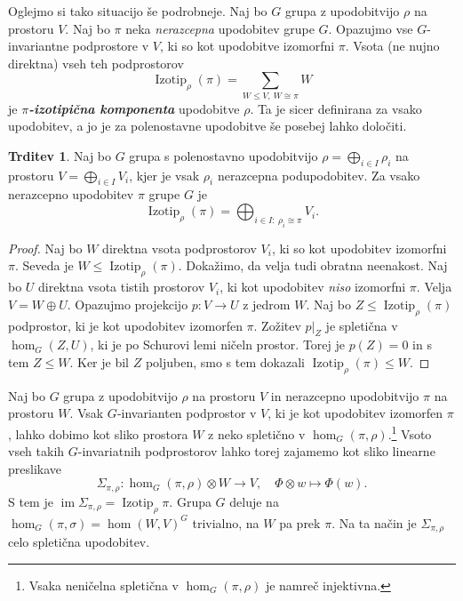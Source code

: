 \documentclass[11pt]{book}
\DeclareMathOperator\image{im}
\DeclareMathOperator\Izotip{Izotip}
\def\definicija{\color{rdeca}\bf\em}
\theoremstyle{definition}
\theoremstyle{zgled}
\theoremstyle{odprtproblem}
\theoremstyle{domacanaloga}
\newenvironment{dokaz}
    {\color{siva}\begin{proof}}
    {\end{proof}}
\theoremstyle{izrek}
\newtheorem*{trditev}{Trditev}
\begin{document}
Oglejmo si tako situacijo še podrobneje. Naj bo $G$ grupa z upodobitvijo $\rho$ na prostoru $V$. Naj bo $\pi$ neka \emph{nerazcepna} upodobitev grupe $G$. Opazujmo vse $G$-invariantne podprostore v $V$, ki so kot upodobitve izomorfni $\pi$. Vsota (ne nujno direktna) vseh teh podprostorov
\[
    \displaystyle \Izotip_{\rho}(\pi) = \sum_{W \leq V, \ W \cong \pi} W
\]
je {\definicija $\pi$-izotipična komponenta} upodobitve $\rho$. Ta je sicer definirana za vsako upodobitev, a jo je za polenostavne upodobitve še posebej lahko določiti.

\begin{trditev}
Naj bo $G$ grupa s polenostavno upodobitvijo $\rho = \bigoplus_{i \in I} \rho_i$ na prostoru $V = \bigoplus_{i \in I} V_i$, kjer je vsak $\rho_i$ nerazcepna podupodobitev. Za vsako nerazcepno upodobitev $\pi$ grupe $G$ je
\[
    \displaystyle \Izotip_{\rho}(\pi) = \bigoplus_{i \in I \colon \ \rho_i \cong \pi} V_i.
\]
\end{trditev}
\begin{dokaz}    
Naj bo $W$ direktna vsota podprostorov $V_i$, ki so kot upodobitev izomorfni $\pi$. Seveda je $W \leq \Izotip_{\rho}(\pi)$. Dokažimo, da velja tudi obratna neenakost. Naj bo $U$ direktna vsota tistih prostorov $V_i$, ki kot upodobitev \emph{niso} izomorfni $\pi$. Velja $V = W \oplus U$. Opazujmo projekcijo $p \colon V \to U$ z jedrom $W$. Naj bo $Z \leq \Izotip_{\rho}(\pi)$ podprostor, ki je kot upodobitev izomorfen $\pi$. Zožitev $p|_Z$ je spletična v $\hom_G(Z, U)$, ki je po Schurovi lemi ničeln prostor. Torej je $p(Z) = 0$ in s tem $Z \leq W$. Ker je bil $Z$ poljuben, smo s tem dokazali $\Izotip_{\rho}(\pi) \leq W$.
\end{dokaz}

Naj bo $G$ grupa z upodobitvijo $\rho$ na prostoru $V$ in nerazcepno upodobitvijo $\pi$ na prostoru $W$. Vsak $G$-invarianten podprostor v $V$, ki je kot upodobitev izomorfen $\pi$, lahko dobimo kot sliko prostora $W$ z neko spletično v $\hom_G(\pi, \rho)$.\footnote{Vsaka neničelna spletična v $\hom_G(\pi, \rho)$ je namreč injektivna.} Vsoto vseh takih $G$-invariatnih podprostorov lahko torej zajamemo kot sliko linearne preslikave
\[
    \Sigma_{\pi, \rho} \colon \hom_G(\pi, \rho) \otimes W \to V, \quad
    \Phi \otimes w \mapsto \Phi(w).
\]
S tem je $\image \Sigma_{\pi, \rho} = \Izotip_{\rho}{\pi}$. Grupa $G$ deluje na $\hom_G(\pi, \sigma) = \hom(W,V)^G$ trivialno, na $W$ pa prek $\pi$. Na ta način je $\Sigma_{\pi, \rho}$ celo spletična upodobitev.
\end{document}
